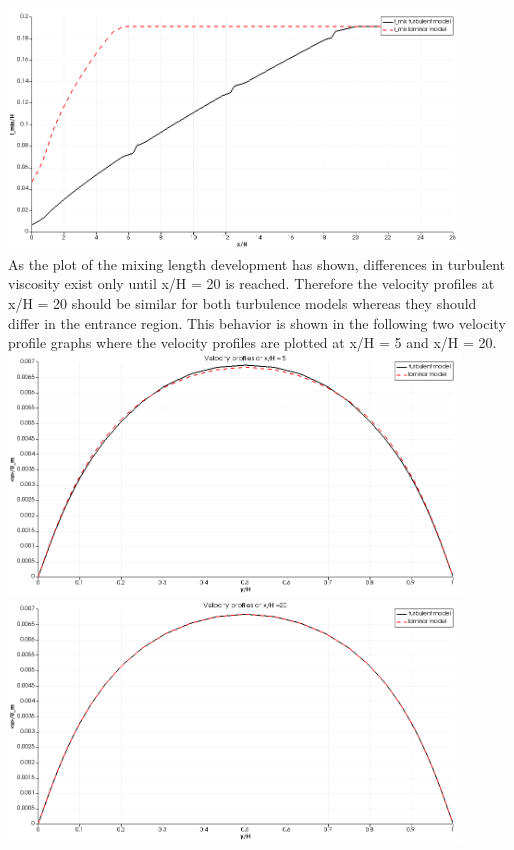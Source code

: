 \documentclass[a4paper]{article}
\begin{document}
\begin{itemize}
\includegraphics[width=0.9\textwidth]{pictures/2_Mixing_lengths}\\

As the plot of the mixing length development has shown, differences in turbulent viscosity exist only until x/H = 20 is reached. Therefore the velocity profiles at x/H = 20 should be similar for both turbulence models whereas they should differ in the entrance region. This behavior is shown in the following two velocity profile graphs where the velocity profiles are plotted at x/H = 5 and x/H = 20. \\

\includegraphics[width=0.9\textwidth]{pictures/2_Velocity_Profile_x5}\\

\includegraphics[width=0.9\textwidth]{pictures/2_Velocity_Profile_x20}\\


\end{itemize}
\end{document}
